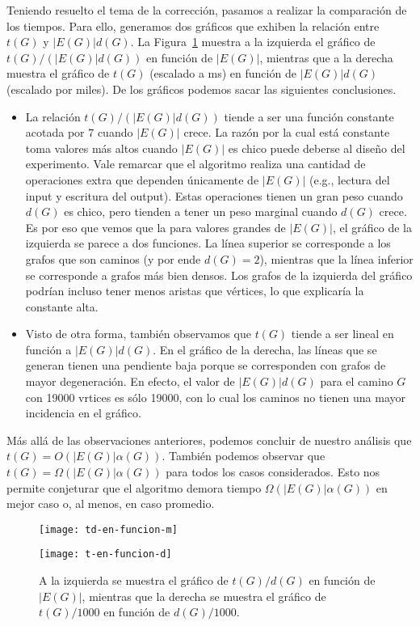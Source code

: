 \documentclass[%
    a4paper,%
    fontsize=12pt,%
    DIV=12,
    twoside,%
    openright,%
    titlepage=true,%
    headsepline,%
    toc=bibliography,%
    parskip=half,%
    cleardoublepage=empty,%
    headings=big,%
]{scrbook}
\begin{document}
Teniendo resuelto el tema de la corrección, pasamos a realizar la comparación de los tiempos.  Para ello, generamos dos gráficos que exhiben la relación entre $t(G)$ y $|E(G)|d(G)$.  La Figura~\ref{fig:t/d-en-funcion-m} muestra a la izquierda el gráfico de $t(G)/(|E(G)|d(G))$  en función de $|E(G)|$, mientras que a la derecha muestra el gráfico de $t(G)$ (escalado a ms) en función de $|E(G)|d(G)$ (escalado por miles).  De los gráficos podemos sacar las siguientes conclusiones.
\begin{itemize}
  \item La relación $t(G)/(|E(G)|d(G))$ tiende a ser una función constante acotada por $7$ cuando $|E(G)|$ crece.  La razón por la cual está constante toma valores más altos cuando $|E(G)|$ es chico puede deberse al diseño del experimento.  Vale remarcar que el algoritmo realiza una cantidad de operaciones extra que dependen únicamente de $|E(G)|$ (e.g., lectura del input y escritura del output).  Estas operaciones tienen un gran peso cuando $d(G)$ es chico, pero tienden a tener un peso marginal cuando $d(G)$ crece.  Es por eso que vemos que la para valores grandes de $|E(G)|$, el gráfico de la izquierda se parece a dos funciones.  La línea superior se corresponde a los grafos que son caminos (y por ende $d(G) = 2$), mientras que la línea inferior se corresponde a grafos más bien densos.  Los grafos de la izquierda del gráfico podrían incluso tener menos aristas que vértices, lo que explicaría la constante alta.
  \item Visto de otra forma, también observamos que $t(G)$ tiende a ser lineal en función a $|E(G)|d(G)$.  En el gráfico de la derecha, las líneas que se generan tienen una pendiente baja porque se corresponden con grafos de mayor degeneración.  En efecto, el valor de $|E(G)|d(G)$ para el camino $G$ con 19000 vrtices es sólo 19000, con lo cual los caminos no tienen una mayor incidencia en el gráfico.   
\end{itemize}
Más allá de las observaciones anteriores, podemos concluir de nuestro análisis que $t(G) = O(|E(G)|\alpha(G))$.  También podemos observar que $t(G) = \Omega(|E(G)|\alpha(G))$ para todos los casos considerados.  Esto nos permite conjeturar que el algoritmo demora tiempo $\Omega(|E(G)|\alpha(G))$ en mejor caso o, al menos, en caso promedio.






\begin{figure}
  \begin{minipage}{.5\linewidth}
    \centering
    \texttt{[image: td-en-funcion-m]}
  \end{minipage}%
  \begin{minipage}{.5\linewidth}
    \centering
    \texttt{[image: t-en-funcion-d]}
  \end{minipage}
  \caption{A la izquierda se muestra el gráfico de $t(G)/d(G)$ en función de $|E(G)|$, mientras que la derecha se muestra el gráfico de $t(G)/1000$ en función de $d(G)/1000$.}\label{fig:t/d-en-funcion-m}
\end{figure}
\end{document}
